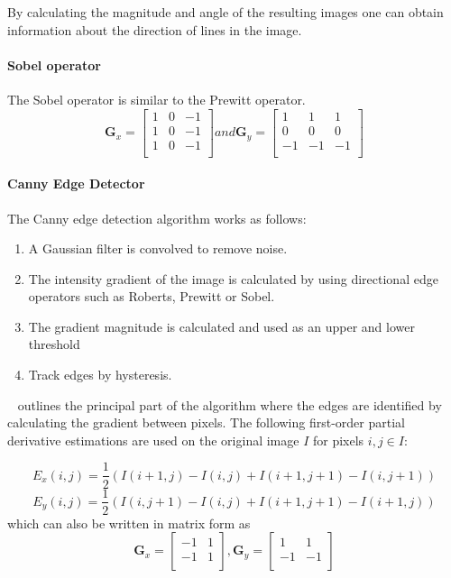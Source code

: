 \documentclass[a4paper, 12pt]{report}
\begin{document}
By calculating the magnitude and angle of the resulting images one can obtain
information about the direction of lines in the image.

\paragraph{Sobel operator}
The Sobel operator is similar to the Prewitt operator.
\[\mathbf{G}_x=\begin{bmatrix}
        1 & 0 & -1 \\
        1 & 0 & -1 \\
        1 & 0 & -1 \\
    \end{bmatrix} and
    \mathbf{G}_y=\begin{bmatrix}
        1  & 1  & 1  \\
        0  & 0  & 0  \\
        -1 & -1 & -1 \\
    \end{bmatrix}
\]

\paragraph{Canny Edge Detector}
The Canny edge detection algorithm works as follows:
\begin{enumerate}
    \item A Gaussian filter is convolved to remove noise.
    \item The intensity gradient of the image is calculated by using directional edge
          operators such as Roberts, Prewitt or Sobel.
    \item The gradient magnitude is calculated and used as an upper and lower threshold
    \item Track edges by hysteresis.
\end{enumerate}

~\cite{rong2014improved} outlines the principal part of the algorithm where the edges are identified by calculating the gradient between pixels. The following first-order partial derivative estimations are used on the original image \(I\) for pixels \(i,j \in I\):

\[E_x(i,j)=\frac{1}{2}(I(i+1,j)-I(i,j)+I(i+1,j+1)-I(i,j+1))\]
\[E_y(i,j)=\frac{1}{2}(I(i,j+1)-I(i,j)+I(i+1,j+1)-I(i+1,j))\]
which can also be written in matrix form as
\[\mathbf{G}_x=\begin{bmatrix}
        -1 & 1 \\
        -1 & 1 \\
    \end{bmatrix},
    \mathbf{G}_y=\begin{bmatrix}
        1  & 1  \\
        -1 & -1 \\
    \end{bmatrix}
\]
\end{document}
